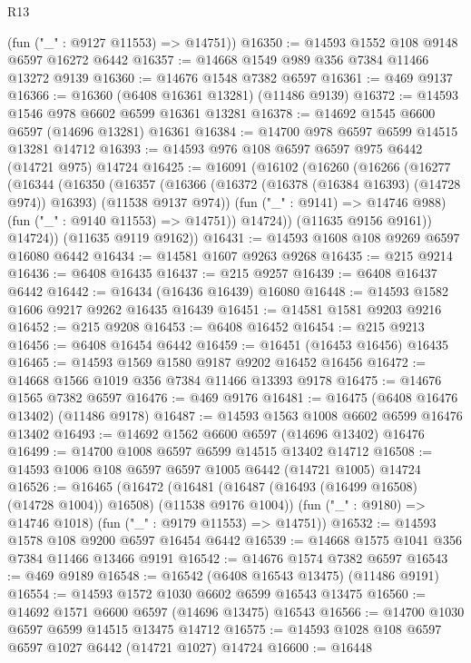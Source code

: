 \begin{lexlean}{R13}
\begin{coremodule}
      (fun ("_" : @9127 @11553) => @14751))
@16350 := @14593 @1552 @108 @9148 @6597 @16272 @6442
@16357 := @14668 @1549 @989 @356 @7384 @11466 @13272 @9139
@16360 := @14676 @1548 @7382 @6597
@16361 := @469 @9137
@16366 := @16360 (@6408 @16361 @13281) (@11486 @9139)
@16372 := @14593 @1546 @978 @6602 @6599 @16361 @13281
@16378 := @14692 @1545 @6600 @6597 (@14696 @13281) @16361
@16384 := @14700 @978 @6597 @6599 @14515 @13281 @14712
@16393 := @14593 @976 @108 @6597 @6597 @975 @6442 (@14721 @975) @14724
@16425 := @16091
    (@16102
      (@16260
        (@16266
          (@16277
            (@16344
              (@16350
                (@16357
                  (@16366
                    (@16372 (@16378 (@16384 @16393) (@14728 @974)) @16393)
                    (@11538 @9137 @974))
                  (fun ("_" : @9141) => @14746 @988)
                  (fun ("_" : @9140 @11553) => @14751))
                @14724))
            (@11635 @9156 @9161))
          @14724))
      (@11635 @9119 @9162))
@16431 := @14593 @1608 @108 @9269 @6597 @16080 @6442
@16434 := @14581 @1607 @9263 @9268
@16435 := @215 @9214
@16436 := @6408 @16435
@16437 := @215 @9257
@16439 := @6408 @16437 @6442
@16442 := @16434 (@16436 @16439) @16080
@16448 := @14593 @1582 @1606 @9217 @9262 @16435 @16439
@16451 := @14581 @1581 @9203 @9216
@16452 := @215 @9208
@16453 := @6408 @16452
@16454 := @215 @9213
@16456 := @6408 @16454 @6442
@16459 := @16451 (@16453 @16456) @16435
@16465 := @14593 @1569 @1580 @9187 @9202 @16452 @16456
@16472 := @14668 @1566 @1019 @356 @7384 @11466 @13393 @9178
@16475 := @14676 @1565 @7382 @6597
@16476 := @469 @9176
@16481 := @16475 (@6408 @16476 @13402) (@11486 @9178)
@16487 := @14593 @1563 @1008 @6602 @6599 @16476 @13402
@16493 := @14692 @1562 @6600 @6597 (@14696 @13402) @16476
@16499 := @14700 @1008 @6597 @6599 @14515 @13402 @14712
@16508 := @14593 @1006 @108 @6597 @6597 @1005 @6442 (@14721 @1005) @14724
@16526 := @16465
    (@16472
      (@16481 (@16487 (@16493 (@16499 @16508) (@14728 @1004)) @16508) (@11538 @9176 @1004))
      (fun ("_" : @9180) => @14746 @1018)
      (fun ("_" : @9179 @11553) => @14751))
@16532 := @14593 @1578 @108 @9200 @6597 @16454 @6442
@16539 := @14668 @1575 @1041 @356 @7384 @11466 @13466 @9191
@16542 := @14676 @1574 @7382 @6597
@16543 := @469 @9189
@16548 := @16542 (@6408 @16543 @13475) (@11486 @9191)
@16554 := @14593 @1572 @1030 @6602 @6599 @16543 @13475
@16560 := @14692 @1571 @6600 @6597 (@14696 @13475) @16543
@16566 := @14700 @1030 @6597 @6599 @14515 @13475 @14712
@16575 := @14593 @1028 @108 @6597 @6597 @1027 @6442 (@14721 @1027) @14724
@16600 := @16448

\end{coremodule}
\end{lexlean}
